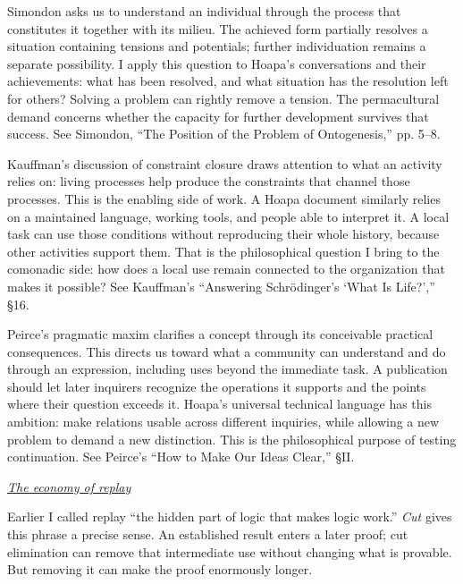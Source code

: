 \documentclass[a4paper,10pt]{article}
\newcommand{\subhead}[1]{\par\addvspace{4pt}\noindent\underline{\emph{#1}}\par\nopagebreak}
\newcommand{\marked}[1]{\par\addvspace{2pt}{\bfseries #1}\par\nopagebreak}
\renewenvironment{leftbar}{%
  \def\FrameCommand{{\color{black!30}\vrule width 1.2pt}\hspace{6pt}}%
  \MakeFramed{\advance\hsize-\width \FrameRestore}}{\endMakeFramed}
\newenvironment{commentary}{\par\vspace{-2pt}\begin{leftbar}\color{black!80}}{\end{leftbar}}
\begin{document}
\begin{commentary}
\marked{\textcolor{statemonadcerulean}{State monad}}
Simondon asks us to understand an individual through the process that constitutes it together with its milieu. The achieved form partially resolves a situation containing tensions and potentials; further individuation remains a separate possibility. I apply this question to Hoapa's conversations and their achievements: what has been resolved, and what situation has the resolution left for others? Solving a problem can rightly remove a tension. The permacultural demand concerns whether the capacity for further development survives that success. See Simondon, “The Position of the Problem of Ontogenesis,” pp. 5–8.\par
\marked{\textcolor{storecomonadtangerine}{Store comonad}}
Kauffman's discussion of constraint closure draws attention to what an activity relies on: living processes help produce the constraints that channel those processes. This is the enabling side of work. A Hoapa document similarly relies on a maintained language, working tools, and people able to interpret it. A local task can use those conditions without reproducing their whole history, because other activities support them. That is the philosophical question I bring to the comonadic side: how does a local use remain connected to the organization that makes it possible? See Kauffman's “Answering Schrödinger's ‘What Is Life?’,” §16.\par
\marked{\textcolor{continuationmint}{Continuation}}
Peirce's pragmatic maxim clarifies a concept through its conceivable practical consequences. This directs us toward what a community can understand and do through an expression, including uses beyond the immediate task. A publication should let later inquirers recognize the operations it supports and the points where their question exceeds it. Hoapa's universal technical language has this ambition: make relations usable across different inquiries, while allowing a new problem to demand a new distinction. This is the philosophical purpose of testing continuation. See Peirce's “How to Make Our Ideas Clear,” §II.\par
\end{commentary}
\subhead{The economy of replay}
Earlier I called replay “the hidden part of logic that makes logic work.” \textcolor{replayolive}{\emph{Cut}} gives this phrase a precise sense. An established result enters a later proof; cut elimination can remove that intermediate use without changing what is provable. But removing it can make the proof enormously longer.\par
\end{document}
